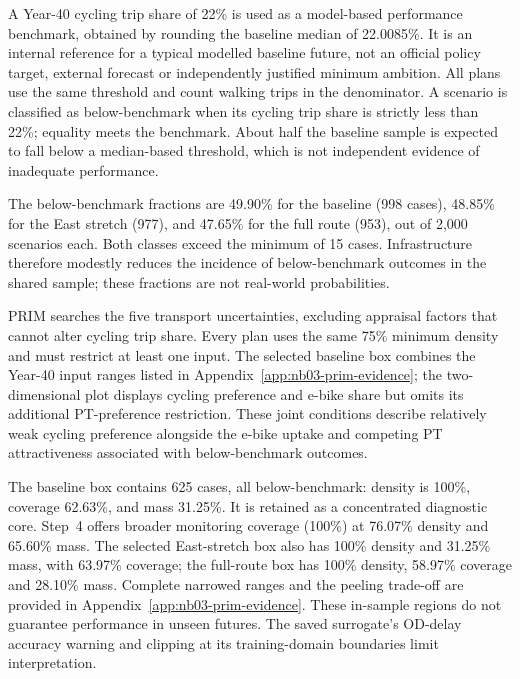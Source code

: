 A Year-40 cycling trip share of 22\% is used as a model-based performance benchmark, obtained by rounding the baseline median of 22.0085\%. It is an internal reference for a typical modelled baseline future, not an official policy target, external forecast or independently justified minimum ambition. All plans use the same threshold and count walking trips in the denominator. A scenario is classified as below-benchmark when its cycling trip share is strictly less than 22\%; equality meets the benchmark. About half the baseline sample is expected to fall below a median-based threshold, which is not independent evidence of inadequate performance.

The below-benchmark fractions are 49.90\% for the baseline (998 cases), 48.85\% for the East stretch (977), and 47.65\% for the full route (953), out of 2,000 scenarios each. Both classes exceed the minimum of 15 cases. Infrastructure therefore modestly reduces the incidence of below-benchmark outcomes in the shared sample; these fractions are not real-world probabilities.

PRIM searches the five transport uncertainties, excluding appraisal factors that cannot alter cycling trip share. Every plan uses the same 75\% minimum density and must restrict at least one input. The selected baseline box combines the Year-40 input ranges listed in Appendix~\ref{app:nb03-prim-evidence}; the two-dimensional plot displays cycling preference and e-bike share but omits its additional PT-preference restriction. These joint conditions describe relatively weak cycling preference alongside the e-bike uptake and competing PT attractiveness associated with below-benchmark outcomes.

The baseline box contains 625 cases, all below-benchmark: density is 100\%, coverage 62.63\%, and mass 31.25\%. It is retained as a concentrated diagnostic core. Step~4 offers broader monitoring coverage (100\%) at 76.07\% density and 65.60\% mass. The selected East-stretch box also has 100\% density and 31.25\% mass, with 63.97\% coverage; the full-route box has 100\% density, 58.97\% coverage and 28.10\% mass. Complete narrowed ranges and the peeling trade-off are provided in Appendix~\ref{app:nb03-prim-evidence}. These in-sample regions do not guarantee performance in unseen futures. The saved surrogate's OD-delay accuracy warning and clipping at its training-domain boundaries limit interpretation.
